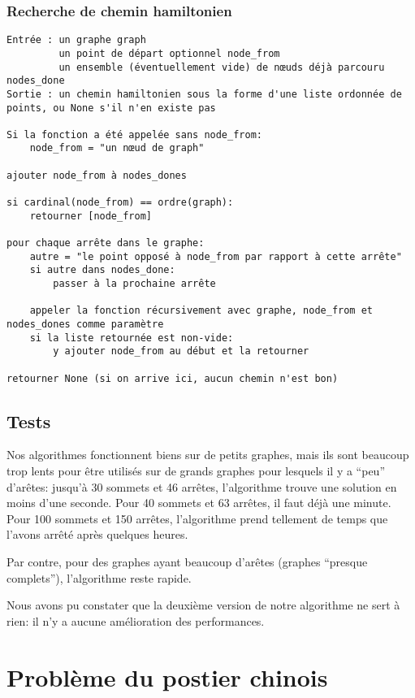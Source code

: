 \documentclass{scrartcl}
\begin{document}
    \subsubsection{Recherche de chemin hamiltonien}
      \begin{lstlisting}
Entrée : un graphe graph
         un point de départ optionnel node_from
         un ensemble (éventuellement vide) de nœuds déjà parcouru nodes_done
Sortie : un chemin hamiltonien sous la forme d'une liste ordonnée de points, ou None s'il n'en existe pas

Si la fonction a été appelée sans node_from:
    node_from = "un nœud de graph"

ajouter node_from à nodes_dones

si cardinal(node_from) == ordre(graph):
    retourner [node_from]

pour chaque arrête dans le graphe:
    autre = "le point opposé à node_from par rapport à cette arrête"
    si autre dans nodes_done:
        passer à la prochaine arrête

    appeler la fonction récursivement avec graphe, node_from et nodes_dones comme paramètre
    si la liste retournée est non-vide:
        y ajouter node_from au début et la retourner

retourner None (si on arrive ici, aucun chemin n'est bon)
      \end{lstlisting}

  \subsection{Tests}
    Nos algorithmes fonctionnent biens sur de petits graphes, mais ils sont
    beaucoup trop lents pour être utilisés sur de grands graphes pour lesquels
    il y a ``peu'' d'arêtes: jusqu'à 30 sommets et 46 arrêtes, l'algorithme
    trouve une solution en moins d'une seconde. Pour 40 sommets et 63 arrêtes,
    il faut déjà une minute. Pour 100 sommets et 150 arrêtes, l'algorithme
    prend tellement de temps que l'avons arrêté après quelques heures.

    Par contre, pour des graphes ayant beaucoup d'arêtes (graphes ``presque
    complets''), l'algorithme reste rapide.

    Nous avons pu constater que la deuxième version de notre algorithme ne sert
    à rien: il n'y a aucune amélioration des performances.

\section{Problème du postier chinois}
\end{document}
